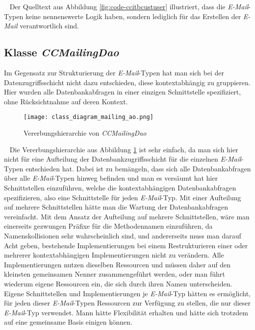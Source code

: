 \ \newline
Der Quelltext aus Abbildung \ref{fig:code-ccitbcustuser} illustriert, dass die \emph{E-Mail}-Typen keine nennenswerte Logik haben, sondern lediglich für das Erstellen der \emph{E-Mail} verantwortlich sind. 

\subsection{Klasse \emph{CCMailingDao}}
Im Gegensatz zur Strukturierung der \emph{E-Mail}-Typen hat man sich bei der Datenzugriffsschicht nicht dazu entschieden, diese kontextabhängig zu gruppieren. Hier wurden alle Datenbankabfragen in einer einzigen Schnittstelle spezifiziert, ohne Rücksichtnahme auf deren Kontext.
\newline
\begin{figure}[h]
\centering
\texttt{[image: class\_diagram\_mailing\_ao.png]} 
\caption{Vererbungshierarchie von \emph{CCMailingDao}}
\label{fig:klassen-hierarchie-ccmailingdao}
\end{figure}
\ \newline
Die Vererbungshierarchie aus Abbildung \ref{fig:klassen-hierarchie-ccmailingdao} ist sehr einfach, da man sich hier nicht für eine Aufteilung der Datenbankzugriffsschicht für die einzelnen \emph{E-Mail}-Typen entschieden hat. Dabei ist zu bemängeln, dass sich alle Datenbankabfragen über alle \emph{E-Mail}-Typen hinweg befinden und man es versäumt hat hier Schnittstellen einzuführen, welche die kontextabhängigen Datenbankabfragen spezifizieren,  also eine Schnittstelle für jeden \emph{E-Mail}-Typ. Mit einer Aufteilung auf mehrere Schnittstellen hätte man die Wartung der Datenbankabfragen vereinfacht. Mit dem Ansatz der Aufteilung auf mehrere Schnittstellen, wäre man einerseits gezwungen Präfixe für die Methodennamen einzuführen, da Namenskollisionen sehr wahrscheinlich sind, und andererseits muss man darauf Acht geben, bestehende Implementierungen bei einem Restrukturieren einer oder mehrerer kontextabhängigen Implementierungen nicht zu verändern. 
\newline
\newline
Alle Implementierungen nutzen dieselben Ressourcen und müssen daher auf den kleinsten gemeinsamen Nenner zusammengeführt werden, oder man führt wiederum eigene Ressourcen ein, die sich durch ihren Namen unterscheiden. 
\newline
\newline
Eigene Schnittstellen und Implementierungen je \emph{E-Mail}-Typ hätten es ermöglicht, für jeden dieser \emph{E-Mail}-Typen Ressourcen zur Verfügung zu stellen, die nur dieser \emph{E-Mail}-Typ verwendet. Mann hätte Flexibilität erhalten und hätte sich trotzdem auf eine gemeinsame Basis einigen können. 
